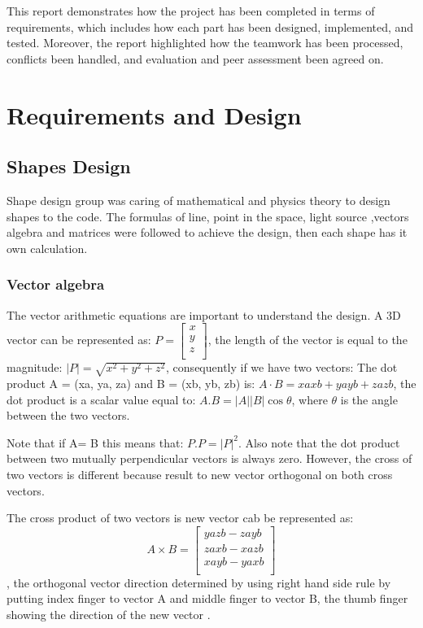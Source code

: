 \documentclass[a4paper, 12pt]{article}
\begin{document}
This report demonstrates how the project has been completed in terms of requirements, which includes how each part has been designed, implemented, and tested. Moreover, the report highlighted how the teamwork has been processed, conflicts been handled, and evaluation and peer assessment been agreed on.


\section{Requirements and Design}

\subsection{Shapes Design}
Shape design group was caring of mathematical and physics theory to design shapes to the code. The formulas of line, point in the space, light source ,vectors algebra and matrices were followed to achieve the design, then each shape has it own calculation.

\subsubsection{Vector algebra}
The vector arithmetic equations are important to understand the design. A 3D vector can be  represented as: $P=\left[\begin{matrix}x\\y\\z\\\end{matrix}\right]$, the length of the vector is equal to the magnitude: $|P|=\sqrt{x^2+y^2+z^2}$, consequently if we have two vectors: The dot product A = (xa, ya, za) and B = (xb, yb, zb) is: $A\cdot B = xa xb + ya yb + za zb$, the dot product is a scalar value equal to: $A.B=\left|A\right||B|\cos{\theta}$, where $\theta$ is the angle between the two vectors.

Note that if A= B this means that: $P.P={|P|}^2$. Also note that the dot product between two mutually perpendicular vectors is always zero. However, the cross of two vectors is different because result to new vector orthogonal on both cross vectors.

The cross product of two vectors is new vector cab be represented as: $$A\times B=\left[\begin{matrix}yazb - zayb \\ zaxb - xazb \\ xayb - yaxb \\\end{matrix}\right]$$, the orthogonal vector direction determined by using right hand side rule by putting index finger to vector A and middle finger to vector B, the thumb finger showing the direction of the new vector \cite{Ray tracing primitives}.
\end{document}
